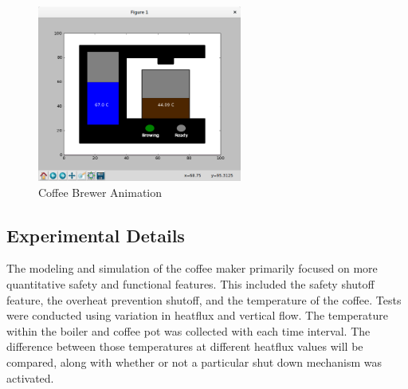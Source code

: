 \documentclass[10pt]{article}
\begin{document}
\begin{center}
  \begin{figure}[H]
    \begin{center}
      \includegraphics[width=0.6\textwidth]{input/animation}
      \caption{Coffee Brewer Animation}
      \label{ref:cofBreAni}
    \end{center}
  \end{figure}
\end{center}


\subsection{Experimental Details}
The modeling and simulation of the coffee maker primarily focused on more quantitative safety and functional features. This included the safety shutoff feature, the overheat prevention shutoff, and the temperature of the coffee. Tests were conducted using variation in heatflux and vertical flow. The temperature within the boiler and coffee pot was collected with each time interval. The difference between those temperatures at different heatflux values will be compared, along with whether or not a particular shut down mechanism was activated.
\end{document}
